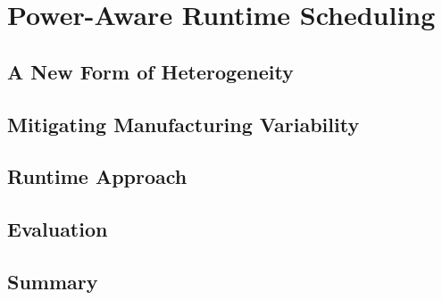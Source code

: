 
\chapter{Power-Aware Runtime Scheduling}
\label{chap:power_aware_runtime}



\section{A New Form of Heterogeneity}

\section{Mitigating Manufacturing Variability}

\section{Runtime Approach}

\section{Evaluation}


\section{Summary}

